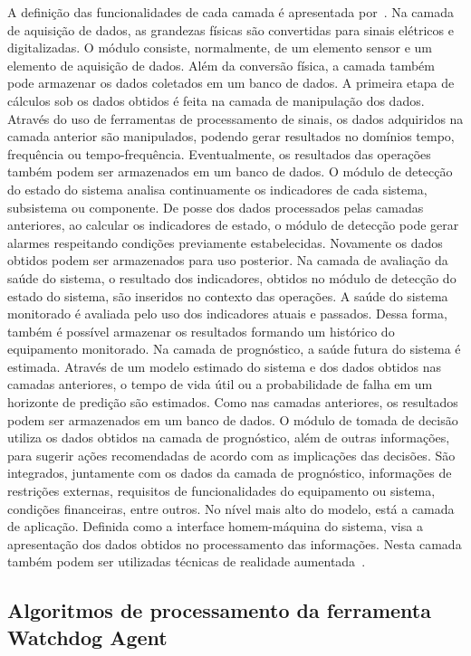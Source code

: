 A definição das funcionalidades de cada camada é apresentada por~\cite{thurston2001open}. Na camada
de aquisição de dados, as grandezas físicas são convertidas para sinais elétricos e digitalizadas. O
módulo consiste, normalmente, de um elemento sensor e um elemento de aquisição de dados. Além da
conversão física, a camada também pode armazenar os dados coletados em um banco de dados. A primeira
etapa de cálculos sob os dados obtidos é feita na camada de manipulação dos dados. Através do uso de
ferramentas de processamento de sinais, os dados adquiridos na camada anterior são manipulados,
podendo gerar resultados no domínios tempo, frequência ou tempo-frequência. Eventualmente, os
resultados das operações também podem ser armazenados em um banco de dados. O módulo de detecção do
estado do sistema analisa continuamente os indicadores de cada sistema, subsistema ou componente. De
posse dos dados processados pelas camadas anteriores, ao calcular os indicadores de estado, o módulo
de detecção pode gerar alarmes respeitando condições previamente estabelecidas. Novamente os dados
obtidos podem ser armazenados para uso posterior. Na camada de avaliação da saúde do sistema, o
resultado dos indicadores, obtidos no módulo de detecção do estado do sistema, são inseridos no
contexto das operações. A saúde do sistema monitorado é avaliada pelo uso dos indicadores atuais e
passados. Dessa forma, também é possível armazenar os resultados formando um histórico do
equipamento monitorado. Na camada de prognóstico, a saúde futura do sistema é estimada. Através de
um modelo estimado do sistema e dos dados obtidos nas camadas anteriores, o tempo de vida útil ou a
probabilidade de falha em um horizonte de predição são estimados. Como nas camadas anteriores, os
resultados podem ser armazenados em um banco de dados. O módulo de tomada de decisão utiliza os
dados obtidos na camada de prognóstico, além de outras informações, para sugerir ações recomendadas
de acordo com as implicações das decisões. São integrados, juntamente com os dados da camada de
prognóstico, informações de restrições externas, requisitos de funcionalidades do equipamento ou
sistema, condições financeiras, entre outros. No nível mais alto do modelo, está a camada de
aplicação. Definida como a interface homem-máquina do sistema, visa a apresentação dos dados obtidos
no processamento das informações. Nesta camada também podem ser utilizadas técnicas de realidade
aumentada~\cite{espindola2011realidade}.


\subsection{Algoritmos de processamento da ferramenta Watchdog Agent}

